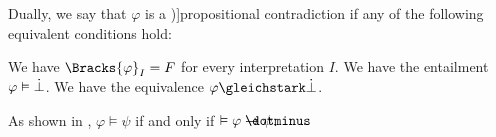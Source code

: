 \begin{definition}
\begin{thmenum}
     Dually, we say that \( \varphi \) is a \term[en=contradictory (formula) (\cite[28]{Kleene2002Logic})]{propositional contradiction} if any of the following equivalent conditions hold:
    \begin{thmenum}
       We have \( \Bracks{\varphi}_I = F \) for every interpretation \( I \).
       We have the entailment \( \varphi \vDash \dot\bot \).
       We have the equivalence \( \varphi \gleichstark \synbot \).
    \end{thmenum}
  \end{thmenum}
\end{definition}
\begin{comments}
  \item As shown in , \( \varphi \vDash \psi \) if and only if \( \vDash \varphi \synimplies \psi \).
\end{comments}

